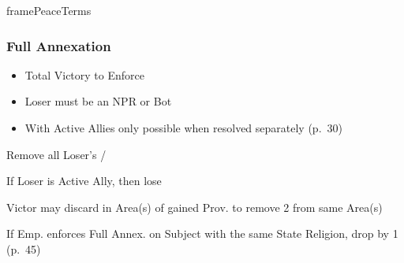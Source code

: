 \documentclass[10pt]{article}
\newlength{\fhPeaceTerms} \setlength\fhPeaceTerms{45.5\baselineskip}
\begin{document}
\begin{dynamiccontents*}{framePeaceTerms}
\begin{eubox}{\fhPeaceTerms}
\begin{multicols}{3}
		\subsubsection*{Full Annexation}
		\begin{itemize}
			{
				\color{peaceReqColor}
				\item {}
				\begin{itemize}
					\item Total Victory to Enforce
					\item Loser must be an NPR or Bot
					\item With Active Allies only possible when resolved separately (p.~30)
				\end{itemize}
			}
			\item Remove all Loser's \alliances/\marriages
			\item If Loser is Active Ally, then lose 
			\item Victor may discard \claims in Area(s) of gained Prov. to remove 2 \unrest from same Area(s)
			\item If Emp. enforces Full Annex. on Subject with the same State Religion, drop \authority by 1 (p.~45)
		\end{itemize}


\end{multicols}
\end{eubox}
\end{dynamiccontents*}
\end{document}
